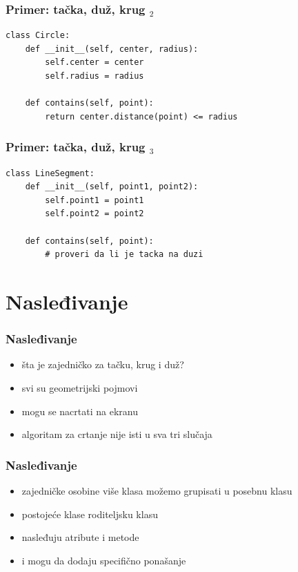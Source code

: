 \documentclass[utf8,compress]{beamer}
\begin{document}
\begin{frame}[fragile]
  \frametitle{Primer: tačka, duž, krug $_2$}
\begin{verbatim}
class Circle:
    def __init__(self, center, radius):
        self.center = center
        self.radius = radius

    def contains(self, point):
        return center.distance(point) <= radius
\end{verbatim}
\end{frame}

\begin{frame}[fragile]
  \frametitle{Primer: tačka, duž, krug $_3$}
\begin{verbatim}
class LineSegment:
    def __init__(self, point1, point2):
        self.point1 = point1
        self.point2 = point2
        
    def contains(self, point):
        # proveri da li je tacka na duzi
\end{verbatim}
\end{frame}

\section[Nasleđivanje]{Nasleđivanje}

\begin{frame}[fragile]
  \frametitle{Nasleđivanje}
  \begin{itemize}
    \item šta je zajedničko za tačku, krug i duž?
    \item svi su geometrijski pojmovi
    \item mogu se nacrtati na ekranu
    \item algoritam za crtanje nije isti u sva tri slučaja
  \end{itemize}
\end{frame}

\begin{frame}[fragile]
  \frametitle{Nasleđivanje}
  \begin{itemize}
    \item zajedničke osobine više klasa možemo grupisati u posebnu  klasu
    \item postojeće klase  roditeljsku klasu
    \item nasleđuju atribute i metode
    \item i mogu da dodaju specifično ponašanje
  \end{itemize}
\end{frame}
\end{document}
